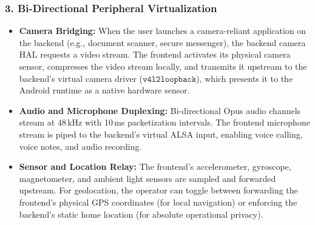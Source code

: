 \subsubsection{3. Bi-Directional Peripheral Virtualization}
\begin{itemize}
    \item \textbf{Camera Bridging:} When the user launches a camera-reliant application on the backend (e.g., document scanner, secure messenger), the backend camera HAL requests a video stream. The frontend activates its physical camera sensor, compresses the video stream locally, and transmits it upstream to the backend's virtual camera driver ($\texttt{v4l2loopback}$), which presents it to the Android runtime as a native hardware sensor.
    \item \textbf{Audio and Microphone Duplexing:} Bi-directional Opus audio channels stream at 48\,kHz with 10\,ms packetization intervals. The frontend microphone stream is piped to the backend's virtual ALSA input, enabling voice calling, voice notes, and audio recording.
    \item \textbf{Sensor and Location Relay:} The frontend's accelerometer, gyroscope, magnetometer, and ambient light sensors are sampled and forwarded upstream. For geolocation, the operator can toggle between forwarding the frontend's physical GPS coordinates (for local navigation) or enforcing the backend's static home location (for absolute operational privacy).
\end{itemize}
